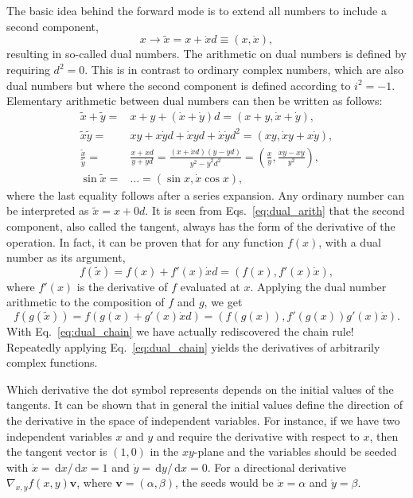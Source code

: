 \documentclass{article}
\newcommand{\D}{\,\textrm{d}}
\begin{document}
The basic idea behind the forward mode is to extend all numbers to include a second component,
\begin{equation}
  \label{eq:ddouble}
  x \rightarrow \tilde x = x + \dot x d \equiv (x,\dot x),
\end{equation}
resulting in so-called dual numbers. The arithmetic on dual numbers is defined by requiring $d^2=0$. This is in contrast to ordinary complex numbers, which are also dual numbers but where the second component is defined according to $i^2=-1$. Elementary arithmetic between dual numbers can then be written as follows:
\begin{equation}
  \label{eq:dual_arith}
  \begin{split}
    \tilde x + \tilde y =& x + y + (\dot x + \dot y)d = (x+y, \dot x +
    \dot y), \\
    \tilde x\tilde y =& xy + x\dot yd + \dot xyd + \dot x\dot yd^2 =
    (xy, \dot xy + x\dot y), \\
    \frac{\tilde x}{\tilde y} =& \frac{x + \dot xd}{y + \dot yd} =
    \frac{(x + \dot xd)(y - \dot yd)}{y^2 - \dot y^2 d^2} =
    \left(\frac{x}{y}, \frac{\dot xy - x\dot y}{y^2} \right), \\
    \sin\tilde x =& \ldots = (\sin x, \dot x\cos x),
  \end{split}
\end{equation}
where the last equality follows after a series expansion. Any ordinary number can be interpreted as $\tilde x=x+0d$. It is seen from Eqs.~\eqref{eq:dual_arith} that the second component, also called the tangent, always has the form of the derivative of the operation. In fact, it can be proven that for any function $f(x)$, with a dual number as its argument,
\begin{equation}
  \label{eq:dual_general}
  f(\tilde x) = f(x) + f'(x)\dot xd = \left( f(x), f'(x)\dot x
  \right),
\end{equation}
where $f'(x)$ is the derivative of $f$ evaluated at $x$. Applying the dual number arithmetic to the composition of $f$ and $g$, we get
\begin{equation}
  \label{eq:dual_chain}
  f(g(\tilde x)) = f(g(x) + g'(x)\dot xd) = \left( f(g(x)),
    f'(g(x))g'(x)\dot x \right).
\end{equation}
With Eq.~\eqref{eq:dual_chain} we have actually rediscovered the chain rule! Repeatedly applying Eq.~\eqref{eq:dual_chain} yields the derivatives of arbitrarily complex functions.

Which derivative the dot symbol represents depends on the initial values of the tangents. It can be shown that in general the initial values define the direction of the derivative in the space of independent variables. For instance, if we have two independent variables $x$ and $y$ and require the derivative with respect to $x$, then the tangent vector is $(1,0)$ in the $xy$-plane and the variables should be seeded with $\dot x = \D x/\D x = 1$ and $\dot y = \D y/\D x = 0$. For a directional derivative $\nabla_{x,y}f(x,y) \bm v$, where $\bm v = (\alpha, \beta)$, the seeds would be $\dot x = \alpha$ and $\dot y = \beta$.
\end{document}
